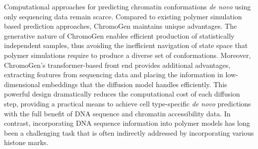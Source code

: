 \documentclass[12pt,letterpaper]{article}
\begin{document}
Computational approaches for predicting chromatin conformations \emph{de novo} using only sequencing data remain scarce. Compared to existing polymer simulation based prediction approaches, ChromoGen maintains unique advantages. The generative nature of ChromoGen enables efficient production of statistically independent samples, thus avoiding the inefficient navigation of state space that polymer simulations require to produce a diverse set of conformations. Moreover, ChromoGen's transformer-based front end provides additional advantages,  extracting features from sequencing data and placing the information in low-dimensional embeddings that the diffusion model handles efficiently. This powerful design dramatically reduces the computational cost of each diffusion step, providing a practical means to achieve cell type-specific \emph{de novo} predictions with the full benefit of DNA sequence and chromatin accessibility data. In contrast, incorporating DNA sequence information into polymer models has long been a challenging task that is often indirectly addressed by incorporating various histone marks. 
\end{document}
